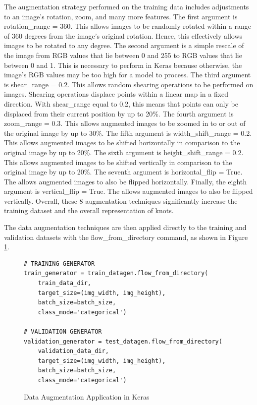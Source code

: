 \documentclass{l4proj}
\begin{document}
The augmentation strategy performed on the training data includes adjustments to an image's rotation, zoom, and many more features.
The first argument is rotation\_range = 360.
This allows images to be randomly rotated within a range of 360 degrees from the image's original rotation.
Hence, this effectively allows images to be rotated to any degree.
The second argument is a simple rescale of the image from RGB values that lie between 0 and 255 to RGB values that lie between 0 and 1.
This is necessary to perform in Keras because otherwise, the image's RGB values may be too high for a model to process.
The third argument is shear\_range = 0.2.
This allows random shearing operations to be performed on images.
Shearing operations displace points within a linear map in a fixed direction.
With shear\_range equal to 0.2, this means that points can only be displaced from their current position by up to 20\%.
The fourth argument is zoom\_range = 0.3.
This allows augmented images to be zoomed in to or out of the original image by up to 30\%.
The fifth argument is width\_shift\_range = 0.2.
This allows augmented images to be shifted horizontally in comparison to the original image by up to 20\%.
The sixth argument is height\_shift\_range = 0.2.
This allows augmented images to be shifted vertically in comparison to the original image by up to 20\%.
The seventh argument is horizontal\_flip = True.
The allows augmented images to also be flipped horizontally.
Finally, the eighth argument is vertical\_flip = True.
The allows augmented images to also be flipped vertically.
Overall, these 8 augmentation techniques significantly increase the training dataset and the overall representation of knots.

The data augmentation techniques are then applied directly to the training and validation datasets with the flow\_from\_directory command, as shown in Figure \ref{fig:KerasDataAugmentationApplication}.
\begin{figure}
\caption{Data Augmentation Application in Keras}
\label{fig:KerasDataAugmentationApplication}
\begin{lstlisting}
# TRAINING GENERATOR
train_generator = train_datagen.flow_from_directory(
    train_data_dir,
    target_size=(img_width, img_height),
    batch_size=batch_size,
    class_mode='categorical')

# VALIDATION GENERATOR
validation_generator = test_datagen.flow_from_directory(
    validation_data_dir,
    target_size=(img_width, img_height),
    batch_size=batch_size,
    class_mode='categorical')
\end{lstlisting}
\end{figure}
\end{document}
